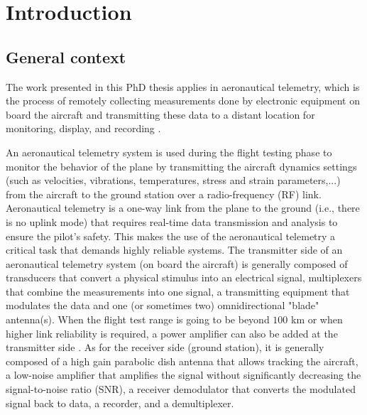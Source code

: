 
\chapter*{Introduction}
\minitoc
\label{chapter:Intro}
\graphicspath{{2-Chapters/1-Chapter/Images/}}
\section*{General context}
\indent The work presented in this PhD thesis applies in aeronautical telemetry, which is the process of remotely collecting measurements done by electronic equipment on board the aircraft and transmitting these data to a distant location for monitoring, display, and recording \cite{telemetry_def}. 

An aeronautical telemetry system is used during the flight testing phase to monitor the behavior of the plane by transmitting the aircraft dynamics settings (such as velocities, vibrations, temperatures, stress and strain parameters,...) from the aircraft to the ground station over a radio-frequency (RF) link. Aeronautical telemetry is a one-way link from the plane to the ground (i.e., there is no uplink mode) that requires real-time data transmission and analysis to ensure the pilot's safety. This makes the use of the aeronautical telemetry a critical task that demands highly reliable systems. The transmitter side of an aeronautical telemetry system (on board the aircraft) is generally composed of transducers that convert a physical stimulus into an electrical signal, multiplexers that combine the measurements into one signal, a transmitting equipment that modulates the data and one (or sometimes two) omnidirectional "blade" antenna(s). When the flight test range is going to be beyond $100$ km or when higher link reliability is required, a power amplifier can also be added at the transmitter side \cite{stacey2008aeronautical}. As for the receiver side (ground station), it is generally composed of a high gain parabolic dish antenna that allows tracking the aircraft, a low-noise amplifier that amplifies the signal without significantly decreasing the signal-to-noise ratio (SNR), a receiver demodulator that converts the modulated signal back to data, a recorder, and a demultiplexer.          

